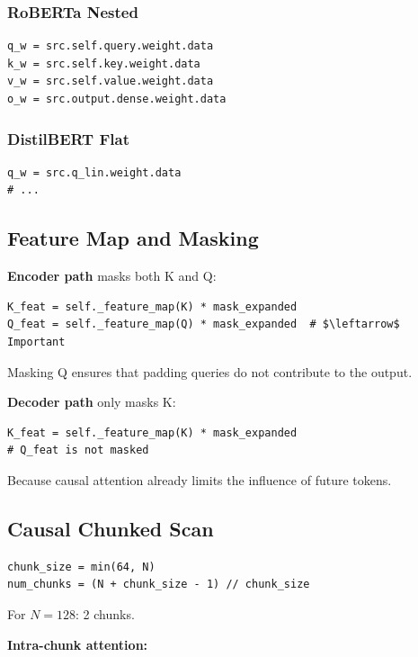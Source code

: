 \subsubsection{RoBERTa Nested}

\begin{lstlisting}
q_w = src.self.query.weight.data
k_w = src.self.key.weight.data
v_w = src.self.value.weight.data
o_w = src.output.dense.weight.data
\end{lstlisting}

\subsubsection{DistilBERT Flat}

\begin{lstlisting}
q_w = src.q_lin.weight.data
# ...
\end{lstlisting}

\subsection{Feature Map and Masking}

\textbf{Encoder path} masks both K and Q:

\begin{lstlisting}
K_feat = self._feature_map(K) * mask_expanded
Q_feat = self._feature_map(Q) * mask_expanded  # $\leftarrow$ Important
\end{lstlisting}

Masking Q ensures that padding queries do not contribute to the output.

\textbf{Decoder path} only masks K:

\begin{lstlisting}
K_feat = self._feature_map(K) * mask_expanded
# Q_feat is not masked
\end{lstlisting}

Because causal attention already limits the influence of future tokens.

\subsection{Causal Chunked Scan}

\begin{lstlisting}
chunk_size = min(64, N)
num_chunks = (N + chunk_size - 1) // chunk_size
\end{lstlisting}

For $N = 128$: 2 chunks.

\textbf{Intra-chunk attention:}

